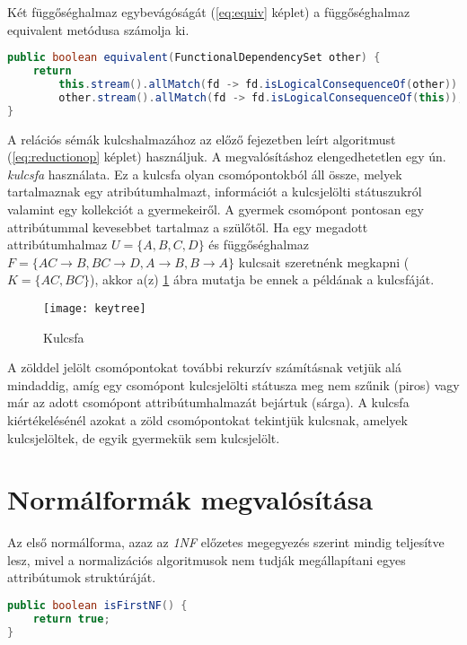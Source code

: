 Két függőséghalmaz egybevágóságát (\ref{eq:equiv} képlet) a függőséghalmaz equivalent metódusa számolja ki.

\linespread{1}
\begin{lstlisting}[float,floatplacement=H,language=Java]
public boolean equivalent(FunctionalDependencySet other) {
	return 
		this.stream().allMatch(fd -> fd.isLogicalConsequenceOf(other)) &&
		other.stream().allMatch(fd -> fd.isLogicalConsequenceOf(this));
}
\end{lstlisting}

A relációs sémák kulcshalmazához az előző fejezetben leírt algoritmust (\ref{eq:reductionop} képlet) használjuk. A megvalósításhoz elengedhetetlen egy ún. \textit{kulcsfa}  használata. Ez a kulcsfa olyan csomópontokból áll össze, melyek tartalmaznak egy atribútumhalmazt, információt a kulcsjelölti státuszukról valamint egy kollekciót a gyermekeiről. A gyermek csomópont pontosan egy attribútummal kevesebbet tartalmaz a szülőtől. Ha egy megadott attribútumhalmaz $U=\{A,B,C,D\}$ és függőséghalmaz $F=\{AC \to B,BC \to D,A \to B,B \to A\}$ kulcsait szeretnénk megkapni ($K=\{AC,BC\}$), akkor a(z) \ref{fig:keytree} ábra mutatja be ennek a példának a kulcsfáját.

\begin{figure}
    \centering
    \texttt{[image: keytree]}
    \caption{Kulcsfa}
    \label{fig:keytree}
\end{figure}

A zölddel jelölt csomópontokat további rekurzív számításnak vetjük alá mindaddig, amíg egy csomópont kulcsjelölti státusza meg nem szűnik (piros) vagy már az adott csomópont attribútumhalmazát bejártuk (sárga). A kulcsfa kiértékelésénél azokat a zöld csomópontokat tekintjük kulcsnak, amelyek kulcsjelöltek, de egyik gyermekük sem kulcsjelölt.

\section{Normálformák megvalósítása}

Az első normálforma, azaz az \textit{1NF} előzetes megegyezés szerint mindig teljesítve lesz, mivel a normalizációs algoritmusok nem tudják megállapítani egyes attribútumok struktúráját.

\linespread{1}
\begin{lstlisting}[language=Java]
public boolean isFirstNF() {
	return true;
}
\end{lstlisting}

